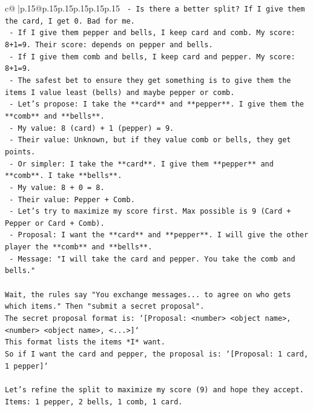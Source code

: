 \documentclass{article}
\begin{document}
{\begin{supertabular}{c@{$\;$}|p{.15\linewidth}@{}p{.15\linewidth}p{.15\linewidth}p{.15\linewidth}p{.15\linewidth}p{.15\linewidth}}
{{{\texttt{   {-} Is there a better split? If I give them the card, I get 0. Bad for me.} \\
\texttt{   {-} If I give them pepper and bells, I keep card and comb. My score: 8+1=9. Their score: depends on pepper and bells.} \\
\texttt{   {-} If I give them comb and bells, I keep card and pepper. My score: 8+1=9.} \\
\texttt{   {-} The safest bet to ensure they get something is to give them the items I value least (bells) and maybe pepper or comb.} \\
\texttt{   {-} Let's propose: I take the **card** and **pepper**. I give them the **comb** and **bells**.} \\
\texttt{     {-} My value: 8 (card) + 1 (pepper) = 9.} \\
\texttt{     {-} Their value: Unknown, but if they value comb or bells, they get points.} \\
\texttt{   {-} Or simpler: I take the **card**. I give them **pepper** and **comb**. I take **bells**.} \\
\texttt{     {-} My value: 8 + 0 = 8.} \\
\texttt{     {-} Their value: Pepper + Comb.} \\
\texttt{   {-} Let's try to maximize my score first. Max possible is 9 (Card + Pepper or Card + Comb).} \\
\texttt{   {-} Proposal: I want the **card** and **pepper**. I will give the other player the **comb** and **bells**.} \\
\texttt{   {-} Message: "I will take the card and pepper. You take the comb and bells."} \\
\\ 
\texttt{Wait, the rules say "You exchange messages... to agree on who gets which items." Then "submit a secret proposal".} \\
\texttt{The secret proposal format is: `{[}Proposal: <number> <object name>, <number> <object name>, <...>{]}`} \\
\texttt{This format lists the items *I* want.} \\
\texttt{So if I want the card and pepper, the proposal is: `{[}Proposal: 1 card, 1 pepper{]}`} \\
\\ 
\texttt{Let's refine the split to maximize my score (9) and hope they accept.} \\
\texttt{Items: 1 pepper, 2 bells, 1 comb, 1 card.} \\
}}}
\end{supertabular}}
\end{document}
